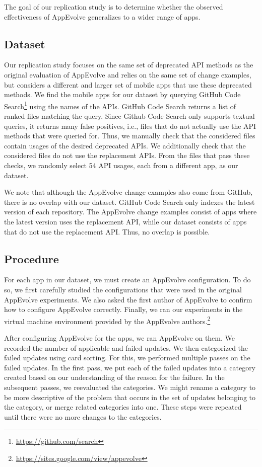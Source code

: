The goal of our replication study is to determine whether the observed
effectiveness of AppEvolve generalizes to a wider range of apps.

\subsection{Dataset}
Our replication study focuses on the same set of deprecated API methods as the
original evaluation of AppEvolve and relies on the same set of change
examples, but considers a different and larger set of mobile apps that use
these deprecated methods.  We find the mobile apps for our dataset by
querying GitHub Code Search\footnote{\url{https://github.com/search}} using
the names of the APIs. GitHub Code Search returns a list of ranked files
matching the query. Since Github Code Search only supports textual queries,
it returns many false positives, i.e., files that do not actually use the
API methods that were queried for.  Thus, we manually check that the
considered files contain usages of the desired deprecated APIs.  We
additionally check that the considered files do not use the replacement
APIs. From the files that pass these checks, we randomly select 54 API
usages, each from a different app, as our dataset.

We note that although the AppEvolve change examples also come from GitHub,
there is no overlap with our dataset.  GitHub Code Search only indexes the
latest version of each repository.  The AppEvolve change examples consist
of apps where the latest version uses the replacement API, while our
dataset consists of apps that do not use the replacement API.  Thus, no
overlap is possible.

\subsection{Procedure}
For each app in our dataset, we must create an AppEvolve configuration. To
do so, we first carefully studied the configurations that were used in the
original AppEvolve experiments. We also asked the first author of AppEvolve
to confirm how to configure AppEvolve correctly. Finally, we ran our
experiments in the virtual machine environment provided by the AppEvolve
authors.\footnote{\url{https://sites.google.com/view/appevolve}}

After configuring AppEvolve for the apps, we ran AppEvolve on them. We
recorded the number of applicable and failed updates. We then categorized
the failed updates using card sorting\cite{spencer09}. For this, we performed
multiple passes on the failed updates. In the first pass, we put each
of the failed updates into a category created based on our understanding of
the reason for the failure. In the subsequent passes, we reevaluated the
categories. We might rename a category to be more descriptive of the
problem that occurs in the set of updates belonging to the category, or
merge related categories into one. These steps were repeated until there
were no more changes to the categories.
